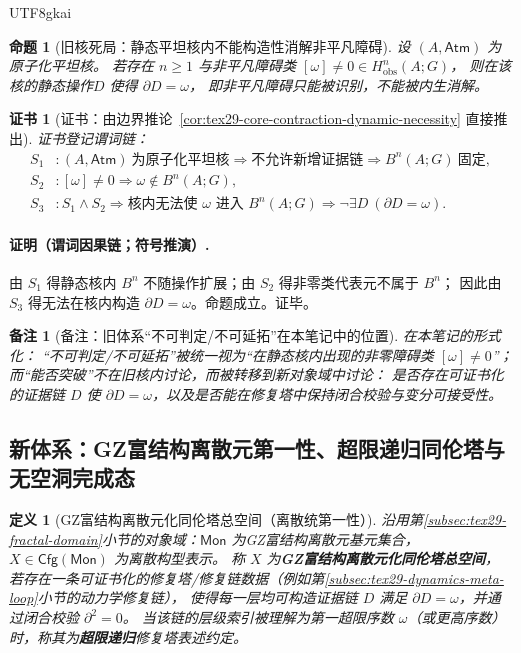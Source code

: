 \documentclass[12pt]{article}
\newtheorem{definition}{定义}[section]
\newtheorem{proposition}{命题}[section]
\newtheorem{remark}{备注}[section]
\newtheorem{Certificate}{证书}[section]
\newcommand{\KouJing}{\texorpdfstring{表述约定}{表述约定}}
\newcommand{\GZMonFull}{\texorpdfstring{GZ富结构离散元}{GZ富结构离散元}}
\newcommand{\GZMon}{\texorpdfstring{GZ富结构离散元}{GZ富结构离散元}}
\newcommand{\GZMonization}{\texorpdfstring{GZ富结构离散元化}{GZ富结构离散元化}}
\begin{document}
\begin{CJK*}{UTF8}{gkai}
\begin{proposition}[旧核死局：静态平坦核内不能构造性消解非平凡障碍]
\label{prop:tex29-ch14-old-no-repair}
设 $(A,\mathsf{Atm})$ 为原子化平坦核。
若存在 $n\ge 1$ 与非平凡障碍类 $[\omega]\neq 0\in H^n_{\mathrm{obs}}(A;G)$，
则在该核的静态操作 $D$ 使得 $\partial D=\omega$，
即非平凡障碍只能被识别，不能被内生消解。
\end{proposition}

\begin{Certificate}[证书：由边界推论~\ref{cor:tex29-core-contraction-dynamic-necessity} 直接推出]
\label{cert:tex29-ch14-old-no-repair}
证书登记谓词链：
\[
\begin{aligned}
  S_1 &: (A,\mathsf{Atm})\ \text{为原子化平坦核}\Rightarrow \text{不允许新增证据链}\Rightarrow B^n(A;G)\ \text{固定},\\
  S_2 &: [\omega]\neq 0\Rightarrow \omega\notin B^n(A;G),\\
  S_3 &: S_1\wedge S_2\Rightarrow \text{核内无法使 }\omega\text{ 进入 }B^n(A;G)\Rightarrow \neg\exists D\ (\partial D=\omega).
\end{aligned}
\]
\end{Certificate}

\paragraph{证明（谓词因果链；符号推演）.}
由 $S_1$ 得静态核内 $B^n$ 不随操作扩展；由 $S_2$ 得非零类代表元不属于 $B^n$；
因此由 $S_3$ 得无法在核内构造 $\partial D=\omega$。命题成立。证毕。

\begin{remark}[备注：旧体系“不可判定/不可延拓”在本笔记中的位置]
在本笔记的形式化：
“不可判定/不可延拓”被统一视为“在静态核内出现的非零障碍类 $[\omega]\neq 0$”；
而“能否突破”不在旧核内讨论，而被转移到新对象域中讨论：
是否存在可证书化的证据链 $D$ 使 $\partial D=\omega$，以及是否能在修复塔中保持闭合校验与变分可接受性。
\end{remark}

\subsection{新体系：\GZMonFull{}第一性、超限递归同伦塔与无空洞完成态}
\label{subsec:tex29-ch14-new}

\begin{definition}[\GZMonization{}同伦塔总空间（离散统第一性）]
沿用第\ref{subsec:tex29-fractal-domain}小节的对象域：$\mathsf{Mon}$ 为\GZMon{}基元集合，$X\in\mathsf{Cfg}(\mathsf{Mon})$ 为离散构型表示。
称 $X$ 为\textbf{\GZMonization{}同伦塔总空间}，若存在一条可证书化的修复塔/修复链数据（例如第\ref{subsec:tex29-dynamics-meta-loop}小节的动力学修复链），
使得每一层均可构造证据链 $D$ 满足 $\partial D=\omega$，并通过闭合校验 $\partial^2=0$。
当该链的层级索引被理解为第一超限序数 $\omega$（或更高序数）时，称其为\textbf{超限递归}修复塔\KouJing。
\end{definition}


\end{CJK*}
\end{document}
